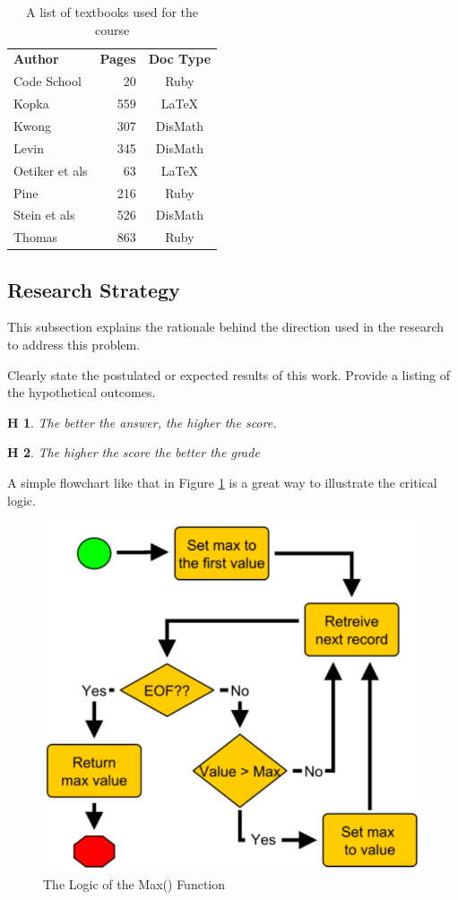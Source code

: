 \documentclass[journal,12pt]{IEEEtran}
\newtheorem{hyp}{H}
\begin{document}
\begin{table}[htb]
\caption{A list of textbooks used for the course}
\label{textbookList}
\medskip
\centering
\small
\begin{tabular}{p{1.25in}rc}
\textbf{Author} & \textbf{Pages} & \textbf{Doc Type}\\
Code School\cite{CodeSchool:2013} & 20 & Ruby\\
Kopka\cite{Kopka:2003} & 559 & \LaTeX \\
Kwong\cite{Kwong:2015} & 307 & DisMath\\
Levin\cite{Levin:2017} & 345 & DisMath\\
Oetiker et als\cite{Oetiker:1996} & 63 & \LaTeX\\
Pine\cite{Pine:2014} & 216 & Ruby \\
Stein et als\cite{Stein:2011} & 526 & DisMath\\
Thomas\cite{Thomas:2013} & 863 & Ruby \\
\end{tabular}
\end{table}


\subsection{Research Strategy}
This subsection explains the rationale behind the direction used in the research to address this problem. 

Clearly state the postulated or expected results of this work. Provide a listing of the hypothetical outcomes.

\begin{hyp}
The better the answer, the higher the score.
\end{hyp}

\begin{hyp}
The higher the score the better the grade
\end{hyp} 



A simple flowchart like that in Figure \ref{fig_flowchart} is a great way to illustrate the critical logic.

\begin{figure}[htb]
\centering
\includegraphics[width=0.8\columnwidth]{img/flowchart.pdf}
\caption{The Logic of the Max() Function}
\label{fig_flowchart}
\end{figure}
\end{document}
